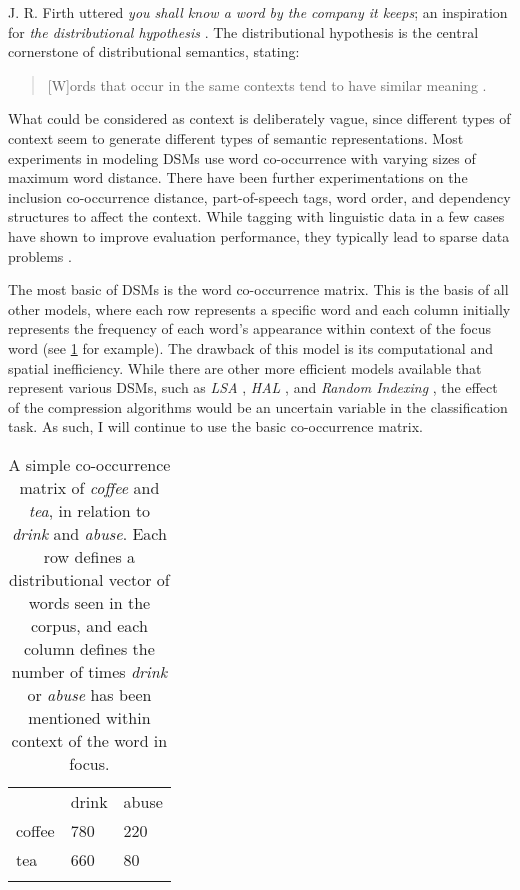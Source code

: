 J. R. Firth uttered \emph{you shall know a word by the company it keeps}; an inspiration for \emph{the distributional hypothesis} \parencite{Sahlgren2008Distributional}. The distributional hypothesis is the central cornerstone of distributional semantics, stating:

\begin{quote}
[W]ords that occur in the same contexts tend to have similar meaning \parencite{Pantel2005Inducing}.
\end{quote}

What could be considered as context is deliberately vague, since different types of context seem to generate different types of semantic representations. Most experiments in modeling DSMs use word co-occurrence with varying sizes of maximum word distance. There have been further experimentations on the inclusion co-occurrence distance, part-of-speech tags, word order, and dependency structures to affect the context. While tagging with linguistic data in a few cases have shown to improve evaluation performance, they typically lead to sparse data problems \parencite{Sahlgren2008Distributional}.

The most basic of DSMs is the word co-occurrence matrix. This is the basis of all other models, where each row represents a specific word and each column initially represents the frequency of each word's appearance within context of the focus word (see \cref{tbl:coffeetea} for example). The drawback of this model is its computational and spatial inefficiency. While there are other more efficient models available that represent various DSMs, such as \emph{LSA} \parencite{Landauer1997Solution}, \emph{HAL} \parencite{Lund1995Semantic}, and \emph{Random Indexing} \parencite{Kanerva2000Random}, the effect of the compression algorithms would be an uncertain variable in the classification task. As such, I will continue to use the basic co-occurrence matrix.

\begin{table}[H]
    \centering
    \begin{tabular}{lll}
    \toprule
    ~      & drink & abuse \\ \addlinespace
    \hline
    coffee & 780   & 220   \\
    tea    & 660   & 80    \\
    \bottomrule
    \addlinespace
    \end{tabular}
    \caption{A simple co-occurrence matrix of \emph{coffee} and \emph{tea}, in relation to \emph{drink} and \emph{abuse}. Each row defines a distributional vector of words seen in the corpus, and each column defines the number of times \emph{drink} or \emph{abuse} has been mentioned within context of the word in focus. }
    \label{tbl:coffeetea}
\end{table}


